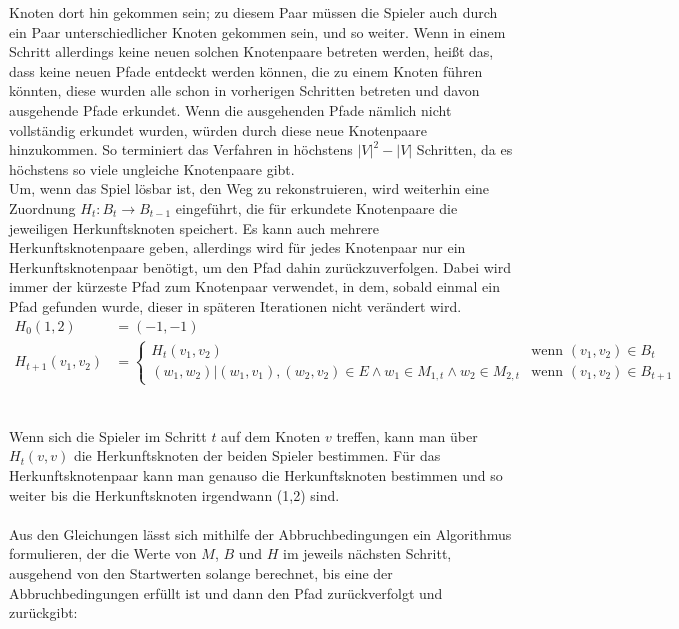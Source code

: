 \documentclass[a4paper,10pt,ngerman]{scrartcl}
\begin{document}
Knoten dort hin gekommen sein; zu diesem Paar müssen die Spieler auch durch ein Paar unterschiedlicher Knoten gekommen sein,
und so weiter. Wenn in einem Schritt allerdings keine neuen solchen Knotenpaare betreten werden, heißt das, dass keine neuen
Pfade entdeckt werden können, die zu einem Knoten führen könnten, diese wurden alle schon in vorherigen Schritten betreten und
davon ausgehende Pfade erkundet. Wenn die ausgehenden Pfade nämlich nicht vollständig erkundet wurden, würden durch diese neue
Knotenpaare hinzukommen. So terminiert das Verfahren in höchstens $|V|^2 - |V|$ Schritten, da es höchstens so viele ungleiche Knotenpaare gibt. \\
Um, wenn das Spiel lösbar ist, den Weg zu rekonstruieren, wird weiterhin eine  Zuordnung $H_t:B_t \rightarrow B_{t-1}$ eingeführt,
die für erkundete Knotenpaare die jeweiligen Herkunftsknoten speichert. Es kann auch mehrere Herkunftsknotenpaare geben, allerdings wird für
jedes Knotenpaar nur ein Herkunftsknotenpaar benötigt, um den Pfad dahin zurückzuverfolgen. 
Dabei wird immer der kürzeste Pfad zum Knotenpaar verwendet, in dem, sobald einmal ein Pfad gefunden wurde, dieser in späteren Iterationen nicht verändert wird. 
\begin{align*}
  H_0(1,2)         & = (-1, -1)                                                                                                        \\
  H_{t+1}(v_1,v_2) & = \begin{cases}
                         H_{t}(v_1, v_2)                                                                    & \text{wenn } (v_1,v_2) \in B_t     \\
                         (w_1, w_2)|(w_1,v_1), (w_2,v_2) \in E \land w_1 \in M_{1,t} \land w_2 \in M_{2, t} & \text{wenn } (v_1,v_2) \in B_{t+1}
                       \end{cases}
\end{align*}\\\\
Wenn sich die Spieler im Schritt $t$ auf dem Knoten $v$ treffen, kann man über $H_{t}(v,v)$ die Herkunftsknoten der
beiden Spieler bestimmen. Für das Herkunftsknotenpaar kann man genauso die Herkunftsknoten bestimmen und so weiter
bis die Herkunftsknoten irgendwann (1,2) sind.\\\\
Aus den Gleichungen lässt sich mithilfe der Abbruchbedingungen ein Algorithmus formulieren, der die Werte von $M$, $B$
und $H$ im jeweils nächsten Schritt, ausgehend von den Startwerten solange berechnet, bis eine der Abbruchbedingungen erfüllt ist und dann den Pfad zurückverfolgt und zurückgibt:
\end{document}
